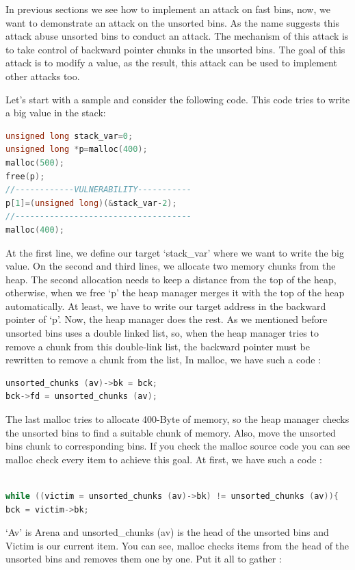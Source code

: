 \documentclass{masterthesis}
\newcommand*\fb{fast bins}
\newcommand*\ub{unsorted bins}
\begin{document}
In previous sections we see how to implement an attack on \fb{}, now, we want to demonstrate an attack on the \ub{}. As the name suggests this attack abuse \ub{} to conduct an attack. The mechanism of this attack is to take control of backward pointer chunks in the \ub{}. The goal of this attack is to modify a value, as the result, this attack can be used to implement other attacks too.

Let’s start with a sample and consider the following code. This code tries to write a big value in the stack:
\begin{lstlisting}[language=c,frame=tlrb]
unsigned long stack_var=0;
unsigned long *p=malloc(400);
malloc(500);
free(p);
//------------VULNERABILITY-----------
p[1]=(unsigned long)(&stack_var-2);
//------------------------------------
malloc(400);
\end{lstlisting}
 At the first line, we define our target ‘stack\_var’ where we want to write the big value. On the second and third lines, we allocate two memory chunks from the heap. The second allocation needs to keep a distance from the top of the heap, otherwise, when we free ‘p’ the heap manager merges it with the top of the heap automatically. At least, we have to write our target address in the backward pointer of ‘p’. Now, the heap manager does the rest. As we mentioned before \ub{} uses a double linked list, so, when the heap manager tries to remove a chunk from this double-link list, the backward pointer must be rewritten to remove a chunk from the list, In malloc, we have such a code : 
 
\begin{lstlisting}[language=c,frame=tlrb]
unsorted_chunks (av)->bk = bck;
bck->fd = unsorted_chunks (av);
\end{lstlisting}

The last malloc tries to allocate 400-Byte of memory, so the heap manager checks the \ub{} to find a suitable chunk of memory. Also, move the \ub{} chunk to corresponding bins. If you check the malloc source code you can see malloc check every item to achieve this goal. At first, we have such a code :
\begin{lstlisting}[language=c,frame=tlrb]

while ((victim = unsorted_chunks (av)->bk) != unsorted_chunks (av)){
bck = victim->bk;
\end{lstlisting}
‘Av’ is Arena and unsorted\_chunks (av) is the head of the \ub{} and Victim is our current item. You can see, malloc checks items from the head of the \ub{} and removes them one by one. Put it all to gather :
\end{document}
